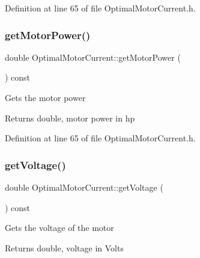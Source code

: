 Definition at line 65 of file Optimal\+Motor\+Current.\+h.

\mbox{\label{class_optimal_motor_current_a345ae983be872a2504c50ff8a96b4fc9}} 
\subsubsection{\texorpdfstring{get\+Motor\+Power()}{getMotorPower()}\hspace{0.1cm}{\footnotesize\ttfamily [3/3]}}
{\footnotesize\ttfamily double Optimal\+Motor\+Current\+::get\+Motor\+Power (\begin{DoxyParamCaption}{ }\end{DoxyParamCaption}) const\hspace{0.3cm}{\ttfamily [inline]}}

Gets the motor power

\begin{DoxyReturn}{Returns}
double, motor power in hp 
\end{DoxyReturn}


Definition at line 65 of file Optimal\+Motor\+Current.\+h.

\mbox{\label{class_optimal_motor_current_a4f9b5f8b83287868a72bfeca97713fd3}} 
\subsubsection{\texorpdfstring{get\+Voltage()}{getVoltage()}\hspace{0.1cm}{\footnotesize\ttfamily [1/3]}}
{\footnotesize\ttfamily double Optimal\+Motor\+Current\+::get\+Voltage (\begin{DoxyParamCaption}{ }\end{DoxyParamCaption}) const\hspace{0.3cm}{\ttfamily [inline]}}

Gets the voltage of the motor

\begin{DoxyReturn}{Returns}
double, voltage in Volts 
\end{DoxyReturn}


